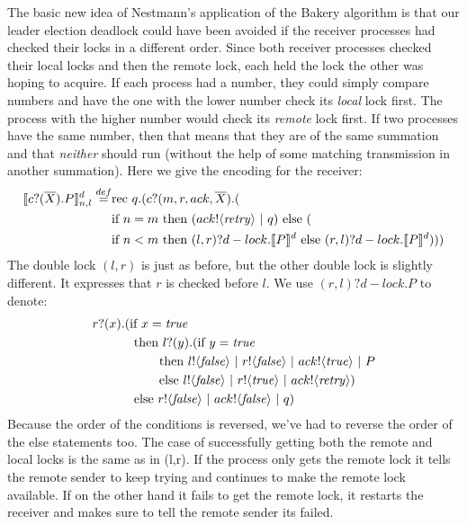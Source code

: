 The basic new idea of Nestmann's application of the Bakery algorithm is that our leader election deadlock could have been avoided if the receiver processes had checked their locks in a different order.  
Since both receiver processes checked their local locks and then the remote lock, each held the lock the other was hoping to acquire.  
If each process had a number, they could simply compare numbers and have the one with the lower number check its \emph{local} lock first.  
The process with the higher number would check its \emph{remote} lock first.  
If two processes have the same number, then that means that they are of the same summation and that \emph{neither} should run (without the help of some matching transmission in another summation).  
Here we give the encoding for the receiver:
\begin{equation*}\begin{split}
	\llbracket{ \ensuremath{{c}?({\overline{X}}).} P}\rrbracket^d_{n,l} \overset{\tiny{def}}{=} & \text{rec }{q}.({c}?({m,r,ack,\overline{X}}).(\\
	&\text{if } {n=m} \text{ then } ({ack}!\langle{ \ensuremath{\text{\emph{retry}}} }\rangle\ |\  q) \text{ else }(\\
	&\text{if } {n<m} \text{ then } (l,r)?d-lock.\llbracket{P}\rrbracket^d \text{ else } (r,l)?d-lock.\llbracket{P}\rrbracket^d)))\\
\end{split}\end{equation*}
The double lock $(l,r)$ is just as before, but the other double lock is slightly different.  It expresses that $r$ is checked before $l$.  We use $(r,l)?d-lock.P$ to denote:
\begin{equation}\begin{split}
	{r}?({x}).(&\text{if } {x= \ensuremath{\text{\emph{true}}} }\\
	&\text{ then } {l}?({y}). (\text{if } {y= \ensuremath{\text{\emph{true}}} }\\
	&\ \ \ \ \ \ \text{ then } {l}!\langle{ \ensuremath{\text{\emph{false}}} }\rangle \ |\  {r}!\langle{ \ensuremath{\text{\emph{false}}} }\rangle \ |\  {ack}!\langle{ \ensuremath{\text{\emph{true}}} }\rangle \ |\  P\\
	&\ \ \ \ \ \ \text{ else } {l}!\langle{ \ensuremath{\text{\emph{false}}} }\rangle \ |\  {r}!\langle{ \ensuremath{\text{\emph{true}}} }\rangle \ |\  {ack}!\langle{ \ensuremath{\text{\emph{retry}}} }\rangle)\\
	&\text{ else }{r}!\langle{ \ensuremath{\text{\emph{false}}} }\rangle \ |\  {ack}!\langle{ \ensuremath{\text{\emph{false}}} }\rangle\ |\  q)\\
\end{split}\end{equation}%
Because the order of the conditions is reversed, we've had to reverse the order of the else statements too.  The case of successfully getting both the remote and local locks is the same as in (l,r).  If the process only gets the remote lock it tells the remote sender to keep trying and continues to make the remote lock available.  If on the other hand it fails to get the remote lock, it restarts the receiver and makes sure to tell the remote sender its failed.


